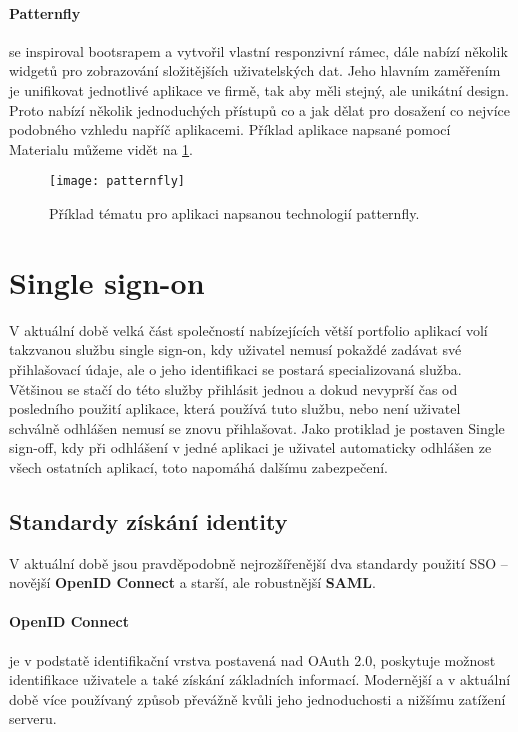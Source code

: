 \paragraph{Patternfly} se inspiroval bootsrapem a vytvořil vlastní responzivní rámec, dále nabízí několik widgetů pro zobrazování složitějších uživatelských dat. Jeho hlavním zaměřením je unifikovat jednotlivé aplikace ve firmě, tak aby měli stejný, ale unikátní design. Proto nabízí několik jednoduchých přístupů co a jak dělat pro dosažení co nejvíce podobného vzhledu napříč aplikacemi. \cite{patternfly} Příklad aplikace napsané pomocí Materialu můžeme vidět na \ref{patternfly-fig}.

\begin{figure}[htp]
\centering
\texttt{[image: patternfly]}
\caption{Příklad tématu pro aplikaci napsanou technologií patternfly.}
\label{patternfly-fig}
\end{figure}

\section{Single sign-on}
\par V aktuální době velká část společností nabízejících větší portfolio aplikací volí takzvanou službu single sign-on, kdy uživatel nemusí pokaždé zadávat své přihlašovací údaje, ale o jeho identifikaci se postará specializovaná služba. Většinou se stačí do této služby přihlásit jednou a dokud nevyprší čas od posledního použití aplikace, která používá tuto službu, nebo není uživatel schválně odhlášen nemusí se znovu přihlašovat. Jako protiklad je postaven Single sign-off, kdy při odhlášení v jedné aplikaci je uživatel automaticky odhlášen ze všech ostatních aplikací, toto napomáhá dalšímu zabezpečení.

\subsection{Standardy získání identity}
\par V aktuální době jsou pravděpodobně nejrozšířenější dva standardy použití SSO -- novější \textbf{OpenID Connect} a starší, ale robustnější \textbf{SAML}.
\paragraph{OpenID Connect} je v podstatě identifikační vrstva postavená nad OAuth 2.0, poskytuje možnost identifikace uživatele a také získání základních informací. Modernější a v aktuální době více používaný způsob převážně kvůli jeho jednoduchosti a nižšímu zatížení serveru. \cite{oidc}

